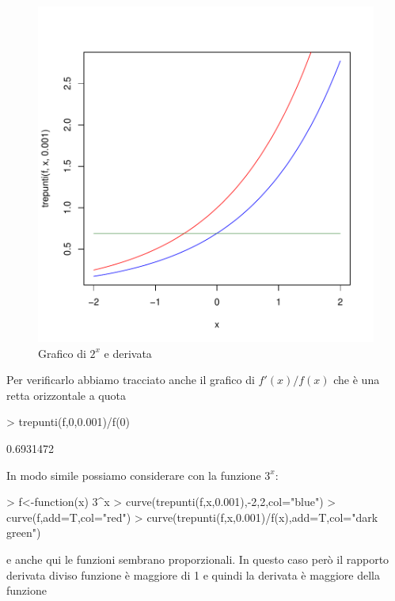 \documentclass[onecolumn,11pt]{book}
\begin{document}
\begin{figure}[ htbp]
\begin{center}
\includegraphics{statisticaconR-092}
\caption{Grafico di $2^x$ e derivata}
\label{fig:der2x}
\end{center}
\end{figure}
Per verificarlo abbiamo tracciato anche il grafico di $f'(x)/f(x)$ che \`e una retta orizzontale a quota
\begin{Schunk}
\begin{Sinput}
>  trepunti(f,0,0.001)/f(0)
\end{Sinput}
\begin{Soutput}
[1] 0.6931472
\end{Soutput}
\end{Schunk}
In modo simile possiamo considerare con la funzione $3^x$:
\begin{Schunk}
\begin{Sinput}
> f<-function(x) 3^x
> curve(trepunti(f,x,0.001),-2,2,col="blue")
> curve(f,add=T,col="red")
> curve(trepunti(f,x,0.001)/f(x),add=T,col="dark green")
\end{Sinput}
\end{Schunk}
e anche qui  le funzioni sembrano proporzionali. In questo caso per\`o il rapporto derivata diviso funzione \`e  maggiore di 1 e quindi la derivata \`e maggiore della funzione
\end{document}
